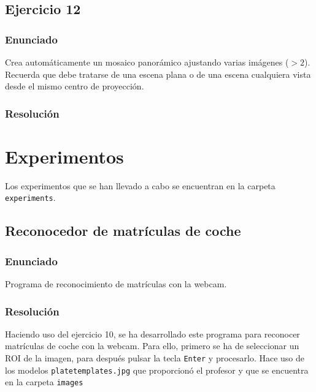 \documentclass[a4paper,10pt,titlepage,oneside,openright]{book}
\begin{document}
\subsection{Ejercicio 12}

\subsubsection*{Enunciado}
Crea automáticamente un mosaico panorámico ajustando varias imágenes ($>2$). Recuerda que debe tratarse de una escena plana o de una escena cualquiera vista desde el mismo centro de proyección.

\subsubsection*{Resolución}




\medskip
\section{Experimentos}
Los experimentos que se han llevado a cabo se encuentran en la carpeta \texttt{experiments}.

\medskip
\subsection{Reconocedor de matrículas de coche}

\subsubsection*{Enunciado}
Programa de reconocimiento de matrículas con la webcam.

\subsubsection*{Resolución}
Haciendo uso del ejercicio 10, se ha desarrollado este programa para reconocer matrículas de coche con la webcam. Para ello, primero se ha de seleccionar un ROI de la imagen, para después pulsar la tecla \texttt{Enter} y procesarlo. Hace uso de los modelos \texttt{platetemplates.jpg} que proporcionó el profesor y que se encuentra en la carpeta \texttt{images}
\end{document}
